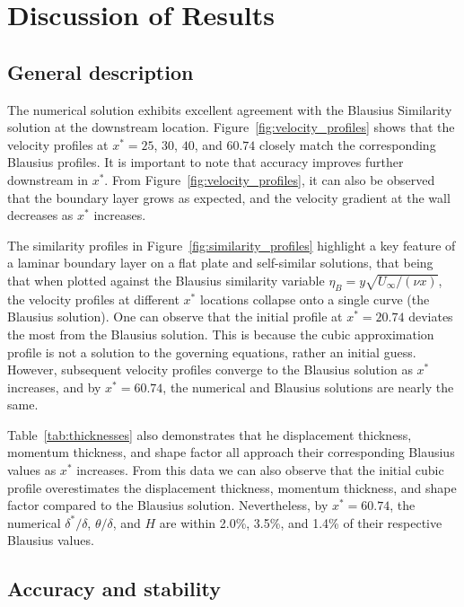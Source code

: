 \documentclass[letterpaper,12pt]{article}
\begin{document}

\section{Discussion of Results}
\subsection{General description}

The numerical solution exhibits excellent agreement with the Blausius Similarity solution at the downstream location. Figure~\ref{fig:velocity_profiles} shows that the velocity profiles at $x^* = 25$, $30$, $40$, and $60.74$ closely match the corresponding Blausius profiles. It is important to note that accuracy improves further downstream in $x^*$. From Figure~\ref{fig:velocity_profiles}, it can also be observed that the boundary layer grows as expected, and the velocity gradient at the wall decreases as $x^*$ increases.

The similarity profiles in Figure~\ref{fig:similarity_profiles} highlight a key feature of a laminar boundary layer on a flat plate and self-similar solutions, that being that when plotted against the Blausius similarity variable $\eta_B = y \sqrt{U_\infty/(\nu x)}$, the velocity profiles at different $x^*$ locations collapse onto a single curve (the Blausius solution). One can observe that the initial profile at $x^* = 20.74$ deviates the most from the Blausius solution. This is because the cubic approximation profile is not a solution to the governing equations, rather an initial guess. However, subsequent velocity profiles converge to the Blausius solution as $x^*$ increases, and by $x^* = 60.74$, the numerical and Blausius solutions are nearly the same.

Table~\ref{tab:thicknesses} also demonstrates that he displacement thickness, momentum thickness, and shape factor all approach their corresponding Blausius values as $x^*$ increases. From this data we can also observe that the initial cubic profile overestimates the displacement thickness, momentum thickness, and shape factor compared to the Blausius solution. Nevertheless, by $x^* = 60.74$, the numerical $\delta^*/\delta$, $\theta/\delta$, and $H$ are within 2.0\%, 3.5\%, and 1.4\% of their respective Blausius values.

\subsection{Accuracy and stability}
\end{document}
